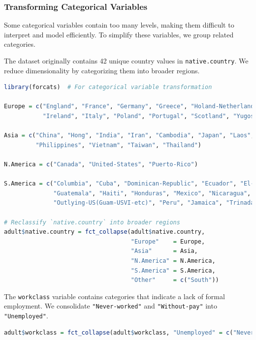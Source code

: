 \documentclass[
]{book}
\newcommand{\passthrough}[1]{#1}
\theoremstyle{definition}
\theoremstyle{definition}
\theoremstyle{definition}
\theoremstyle{definition}
\theoremstyle{remark}
\begin{document}
\subsubsection*{Transforming Categorical Variables}\label{transforming-categorical-variables}

Some categorical variables contain too many levels, making them difficult to interpret and model efficiently. To simplify these variables, we group related categories.

The dataset originally contains 42 unique country values in \passthrough{\lstinline!native.country!}. We reduce dimensionality by categorizing them into broader regions.

\begin{lstlisting}[language=R]
library(forcats)  # For categorical variable transformation

Europe = c("England", "France", "Germany", "Greece", "Holand-Netherlands", "Hungary", 
           "Ireland", "Italy", "Poland", "Portugal", "Scotland", "Yugoslavia")

Asia = c("China", "Hong", "India", "Iran", "Cambodia", "Japan", "Laos", 
         "Philippines", "Vietnam", "Taiwan", "Thailand")

N.America = c("Canada", "United-States", "Puerto-Rico")

S.America = c("Columbia", "Cuba", "Dominican-Republic", "Ecuador", "El-Salvador", 
              "Guatemala", "Haiti", "Honduras", "Mexico", "Nicaragua", 
              "Outlying-US(Guam-USVI-etc)", "Peru", "Jamaica", "Trinadad&Tobago")

# Reclassify `native.country` into broader regions
adult$native.country = fct_collapse(adult$native.country, 
                                    "Europe"    = Europe,
                                    "Asia"      = Asia,
                                    "N.America" = N.America,
                                    "S.America" = S.America,
                                    "Other"     = c("South"))
\end{lstlisting}

The \passthrough{\lstinline!workclass!} variable contains categories that indicate a lack of formal employment. We consolidate \passthrough{\lstinline!"Never-worked"!} and \passthrough{\lstinline!"Without-pay"!} into \passthrough{\lstinline!"Unemployed"!}.

\begin{lstlisting}[language=R]
adult$workclass = fct_collapse(adult$workclass, "Unemployed" = c("Never-worked", "Without-pay"))
\end{lstlisting}
\end{document}
